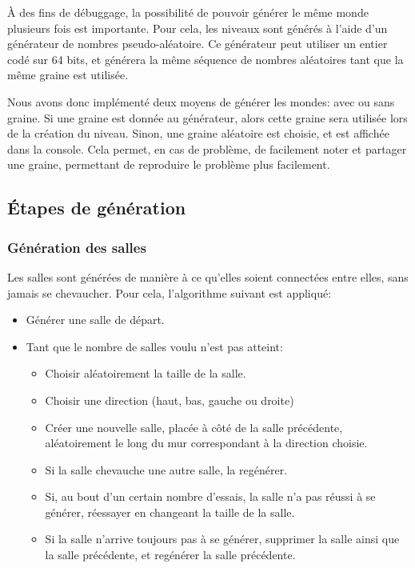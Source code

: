 \documentclass[10pt]{report}
\begin{document}
À des fins de débuggage, la possibilité de pouvoir générer le même monde plusieurs fois est importante.
Pour cela, les niveaux sont générés à l'aide d'un générateur de nombres pseudo-aléatoire.
Ce générateur peut utiliser un entier codé sur 64 bits, et générera la même séquence de nombres
aléatoires tant que la même graine est utilisée. 

Nous avons donc implémenté deux moyens de générer les mondes: avec ou sans graine.
Si une graine est donnée au générateur, alors cette graine sera utilisée lors de la création du niveau.
Sinon, une graine aléatoire est choisie, et est affichée dans la console.
Cela permet, en cas de problème, de facilement noter et partager une graine, permettant de reproduire
le problème plus facilement.

\subsection{Étapes de génération}
\subsubsection{Génération des salles}

Les salles sont générées de manière à ce qu'elles soient connectées entre
elles, sans jamais se chevaucher.
Pour cela, l'algorithme suivant est appliqué:

\begin{itemize}
  \item Générer une salle de départ.
  \item Tant que le nombre de salles voulu n'est pas atteint:
  \begin{itemize}
    \item Choisir aléatoirement la taille de la salle.
    \item Choisir une direction (haut, bas, gauche ou droite)
    \item Créer une nouvelle salle, placée à côté de la salle précédente,
    aléatoirement le long du mur correspondant à la direction choisie.
    \item Si la salle chevauche une autre salle, la regénérer.
    \item Si, au bout d'un certain nombre d'essais, la salle n'a pas réussi
    à se générer, réessayer en changeant la taille de la salle.
    \item Si la salle n'arrive toujours pas à se générer, supprimer la
    salle ainsi que la salle précédente, et regénérer la salle précédente.
  \end{itemize}
\end{itemize}
\end{document}
